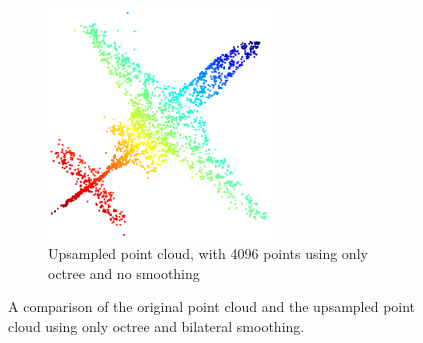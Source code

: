 \begin{figure}[!ht]
\begin{subfigure}{0.3\textwidth}
		\includegraphics[width=0.65\textwidth]{./4096_octree_bilateral.png}
		\caption{Upsampled point cloud, with 4096 points using only octree and no smoothing}
	\end{subfigure}	
	\caption{A comparison of the original point cloud and the upsampled point cloud using only octree and bilateral smoothing.}
	\label{fig:no_smoothing}
\end{figure}



